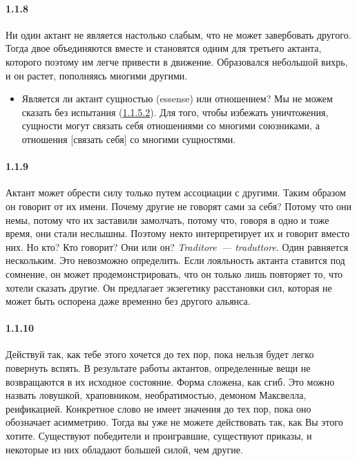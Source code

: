 \paragraph{1.1.8}\hypertarget{par:1.1.8}{} Ни один актант не является настолько слабым, что не может завербовать другого. Тогда двое объединяются вместе и становятся одним для третьего актанта, которого поэтому им легче привести в движение. Образовался небольшой вихрь, и он растет, пополняясь многими другими.
\begin{itemize}
	\item Является ли актант сущностью (essense) или отношением? Мы не можем сказать без испытания (\hyperlink{par:1.1.5.2}{1.1.5.2}). Для того, чтобы избежать уничтожения, сущности могут связать себя отношениями со многими союзниками, а отношения [связать себя] со многими сущностями.
	\end{itemize}

\paragraph{1.1.9}\hypertarget{par:1.1.9}{} Актант может обрести силу только путем ассоциации с другими. Таким образом он говорит от их имени. Почему другие не говорят сами за себя? Потому что они немы, потому что их заставили замолчать, потому что, говоря в одно и тоже время, они стали неслышны. Поэтому некто интерпретирует их и говорит вместо них. Но кто? Кто говорит? Они или он? {\itshape Traditore~--- traduttore}. Один равняется нескольким. Это невозможно определить. Если лояльность актанта ставится под сомнение, он может продемонстрировать, что он только лишь повторяет то, что хотели сказать другие. Он предлагает экзегетику расстановки сил, которая не может быть оспорена даже временно без другого альянса.

\paragraph{1.1.10}\hypertarget{par:1.1.10}{} Действуй так, как тебе этого хочется до тех пор, пока нельзя будет легко повернуть вспять. В результате работы актантов, определенные вещи не возвращаются в их исходное состояние. Форма сложена, как сгиб. Это можно назвать ловушкой, храповником, необратимостью, демоном Максвелла, реификацией. Конкретное слово не имеет значения до тех пор, пока оно обозначает асимметрию. Тогда вы
уже не можете действовать так, как Вы этого хотите. Существуют победители и проигравшие, существуют приказы, и некоторые из них обладают большей силой, чем другие.

